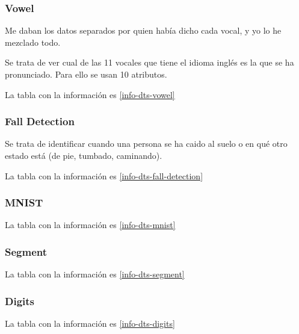 \subsubsection{Vowel}
\cite[See][]{vowel}


Me daban los datos separados por quien había dicho cada vocal, y yo lo he
mezclado todo.

Se trata de ver cual de las 11 vocales que tiene el idioma inglés es la que se
ha pronunciado. Para ello se usan 10 atributos.

La tabla con la información es \ref{info-dts-vowel}

\subsubsection{Fall Detection}
\cite[See][]{fall-detection}

Se trata de identificar cuando una persona se ha caido al suelo o en qué otro
estado está (de pie, tumbado, caminando).

La tabla con la información es \ref{info-dts-fall-detection}

\subsubsection{MNIST}
\cite[See][]{mnist}

La tabla con la información es \ref{info-dts-mnist}

\subsubsection{Segment}
\cite[See][]{segment}

La tabla con la información es \ref{info-dts-segment}

\subsubsection{Digits}
\cite[See][]{digits}

La tabla con la información es \ref{info-dts-digits}


\allDtsInfo
